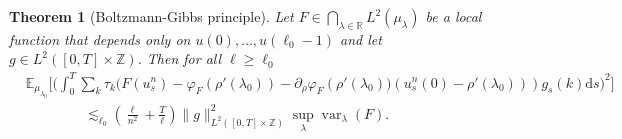 \documentclass[11pt, a4paper]{article}
\newcommand{\mathd}{\mathrm{d}}
\newcommand{\tmop}[1]{\ensuremath{\operatorname{#1}}}
\newtheorem{theorem}{Theorem}[section]
\newcommand{\1}{\mathbf{1}}
\begin{document}
\begin{theorem}[Boltzmann-Gibbs principle]
  \label{thm:first order BG}
  Let $F \in \bigcap_{\lambda \in \mathbb{R}} L^2 ({\mu}_{\lambda})$ be a
  local function that depends only on $u (0), \ldots, u (\ell_0 - 1)$ and let
  $g \in L^2 ([0, T] \times \mathbb{Z})$. Then for all $\ell \geqslant
  \ell_0$
  \begin{align*}
     &\mathbb{E}_{{\mu}_{\lambda_0}} \Big[ \Big( \int_0^T \sum_k \tau_k
     \big( F (u^n_s) - \varphi_F (\rho' (\lambda_0)) - \partial_{\rho}
     \varphi_F ( \rho' (\lambda_0) \big) (u_s^n (0) - \rho'
     (\lambda_0)) ) g_s (k) \mathd s \Big)^2 \Big] \\
     & \hspace{50pt} \lesssim_{\ell_0} \left( \frac{\ell}{n^2} + \frac{T}{\ell} \right) \| g
     \|_{L^2 ([0, T] \times \mathbb{Z})}^2 \sup_{\lambda}
     \tmop{var}_{\lambda} (F) . 
  \end{align*}
\end{theorem}
\end{document}
